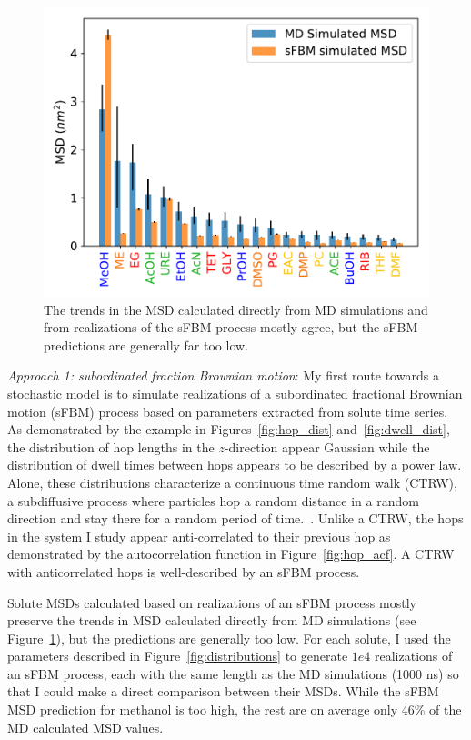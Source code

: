 \documentclass{article}
\begin{document}
  \begin{figure}
  \centering
  \vspace{-0.6cm}
  \includegraphics[width=\linewidth]{all_tamsds.pdf}
  \caption{The trends in the MSD calculated directly from MD simulations and from
  realizations of the sFBM process mostly agree, but the sFBM predictions are generally
  far too low.}\label{fig:sFBM_MSDs}
  \vspace{-0.5cm}
  \end{figure}

  \textit{Approach 1: subordinated fraction Brownian motion}: My first route 
  towards a stochastic model is to simulate realizations of a subordinated 
  fractional Brownian motion (sFBM) process based on parameters extracted 
  from solute time series. As demonstrated by the example in 
  Figures~\ref{fig:hop_dist} and~\ref{fig:dwell_dist}, the distribution of 
  hop lengths in the $z$-direction appear Gaussian while the distribution
  of dwell times between hops appears to be described by a power law. Alone,
  these distributions characterize a continuous time random walk (CTRW), 
  a subdiffusive process where particles hop a random distance in a random
  direction and stay there for a random period of time.~\cite{meroz_toolbox_2015}.
  Unlike a CTRW, the hops in the system I study appear anti-correlated to 
  their previous hop as demonstrated by the autocorrelation function in 
  Figure~\ref{fig:hop_acf}. A CTRW with anticorrelated hops is well-described
  by an sFBM process.~\cite{meroz_subdiffusion_2010} 
  
  Solute MSDs calculated based on realizations of an sFBM process mostly
  preserve the trends in MSD calculated directly from MD simulations (see
  Figure~\ref{fig:sFBM_MSDs}), but the predictions are generally too low. 
  For each solute, I used the parameters described in Figure~\ref{fig:distributions}
  to generate $1e4$ realizations of an sFBM process, each with the same
  length as the MD simulations (1000 ns) so that I could make a direct 
  comparison between their MSDs. While the sFBM MSD prediction for methanol
  is too high, the rest are on average only 46\% of the MD calculated MSD
  values. 
  
\end{document}
